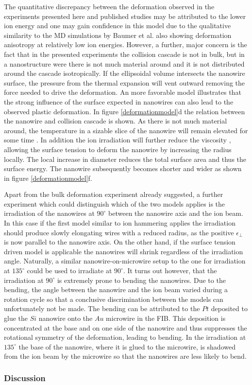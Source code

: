 The quantitative discrepancy between the deformation observed in the experiments presented here and published studies may be attributed to the lower ion energy and one may gain confidence in this model due to the qualitative similarity to the MD simulations by Baumer et al. \cite{baumer_prediction_2014} also showing deformation anisotropy at relatively low ion energies. However, a further, major concern is the fact that in the presented experiments the collision cascade is not in bulk, but in a nanostructure were there is not much material around and it is not distributed around the cascade isotropically. If the ellipsoidal volume intersects the nanowire surface, the pressure from the thermal expansion will vent outward removing the force needed to drive the deformation. An more favorable model illustrates that the strong influence of the surface expected in nanowires can also lead to the observed plastic deformation. In figure \ref{deformationmodel}d the relation between the nanowire and collision cascade is shown. As there is not much material around, the temperature in a sizable slice of the nanowire will remain elevated for some time \cite{borschel_ion-solid_2012,greaves_enhanced_2013,anders_sputtering_2015,johannes_ion_2015}. In addition the ion irradiation will further reduce the viscosity \cite{snoeks_stress_1997,hu_burrowing_2002,mayr_mechanisms_2003}, allowing the surface tension to deform the nanowire by increasing the radius locally. The local increase in diameter reduces the total surface area and thus the surface energy. The nanowire subsequently becomes shorter and wider as shown in figure \ref{deformationmodel}f. 

Apart from the bulk deformation experiment already suggested, a further experiment which could distinguish which of the two models applies is the irradiation of the nanowires at $90^\circ$ between the nanowire axis and the ion beam. In this case if the first model similar to ion hammering applies the irradiation should produce slowly elongating wires with a reduced radius, as the positive $\epsilon_{\perp}$ is now parallel to the nanowire axis. On the other hand, if the surface tension driven model is applicable the nanowires will shrink regardless of the irradiation angle. Naturally, a similar nanowire-on-microwire setup to the one for irradiation at $135^\circ$ could be used to irradiate at $90^\circ$. It turns out however, that the irradiation at $90^\circ$ is extremely prone to bending the nanowires. Due to the bending, the angle between the nanowire and the ion beam varied during a rotation cycle so that a conclusive discrimination between the models can unfortunately not be made. The bending can be attributed to the $Pt$ deposited to glue the $Si$ nanowire onto the $Au$ microwire in the FIB. This deposition is concentrated at the base and on one side of the nanowire and thus suppresses the rotational symmetry of the deformation, leading to bending. In the irradiation at $135^\circ$ the base of the nanowire, where it is glued to the microwire, is shadowed from the ion beam by the microwire so that the nanowires are less likely to bend. 


\subsubsection{Discussion}
